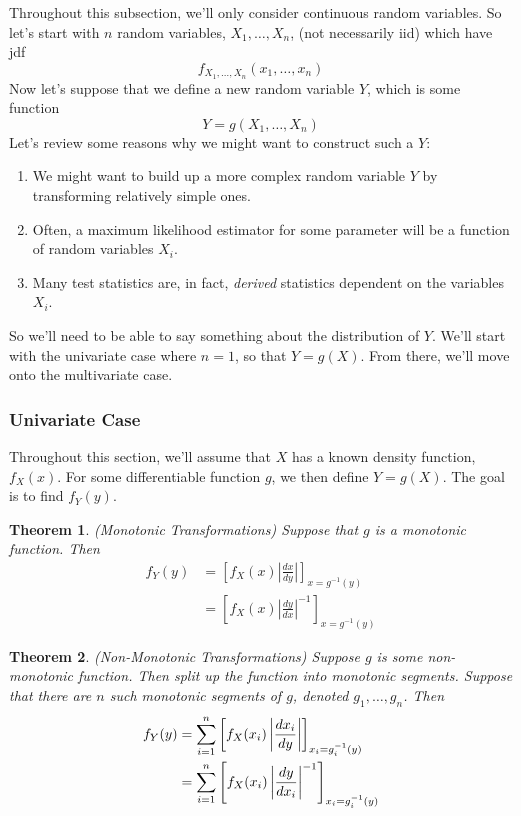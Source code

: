 \documentclass[12pt]{article}
\theoremstyle{plain}
\newtheorem{thm}{Theorem}[section]
\theoremstyle{definition}
\theoremstyle{remark}
\newcommand{\sumin}{\sum^n_{i=1}}
\begin{document}
Throughout this subsection, we'll only consider continuous random
variables. So let's start with $n$ random variables, $X_1, \ldots, X_n$,
(not necessarily iid) which have jdf
   \[ f_{X_1, \ldots, X_n}(x_1, \ldots, x_n) \]
Now let's suppose that we define a new random variable $Y$, which is
some function
   \[ Y = g(X_1, \ldots, X_n) \]
Let's review some reasons why we might want to construct such a $Y$:
\begin{enumerate}
  \item We might want to build up a more complex random variable $Y$
    by transforming relatively simple ones.
  \item Often, a maximum likelihood estimator for some parameter will be
    a function of random variables $X_i$.
  \item Many test statistics are, in fact, \emph{derived} statistics
    dependent on the variables $X_i$.
\end{enumerate}
So we'll need to be able to say something about the distribution of $Y$.
We'll start with the univariate case where $n=1$, so that $Y=g(X)$. From
there, we'll move onto the multivariate case.

\subsubsection{Univariate Case}

Throughout this section, we'll assume that $X$ has a known density
function, $f_X(x)$. For some differentiable function $g$, we then define
$Y = g(X)$. The goal is to find $f_Y(y)$.

\begin{thm}\emph{(Monotonic Transformations)}
Suppose that $g$ is a monotonic function. Then
\begin{align*}
   f_Y(y) &= \left[f_X(x) \left\lvert \frac{dx}{dy}\right\rvert
      \right]_{x = g^{-1}(y)} \\
    &= \left[ f_X(x) \left\lvert \frac{dy}{dx}\right\rvert^{-1}
      \right]_{x = g^{-1}(y)}
\end{align*}
\end{thm}

\begin{thm}\emph{(Non-Monotonic Transformations)}
Suppose $g$ is some non-monotonic function. Then split up the function
into monotonic segments. Suppose that there are $n$ such monotonic
segments of $g$, denoted $g_1,\ldots,g_n$. Then
\begin{align}
   \label{nonmontrans}
   f_Y(y)
   &= \sumin \left[ f_X(x_i) \left\lvert \frac{dx_i}{dy}
      \right\rvert \right]_{x_i=g_i^{-1}(y)}\\
   &= \sumin \left[ f_X(x_i) \left\lvert \frac{dy}{dx_i}
    \right\rvert^{-1} \right]_{x_i=g_i^{-1}(y)}
    \notag
\end{align}
\end{thm}
\end{document}
